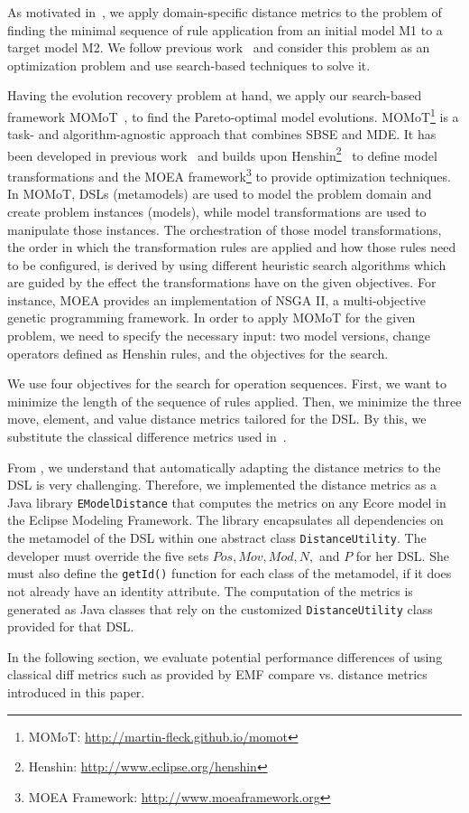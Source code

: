 
As motivated in~, we apply domain-specific distance metrics to the problem of finding the minimal sequence of rule application from an initial model M1 to a target model M2. We follow previous work~\cite{KessentiniMWOD17,FadhelKLW12} and consider this problem as an optimization problem and use search-based techniques to solve it.

Having the evolution recovery problem at hand, we apply our search-based framework MOMoT~\cite{Fleck15,FleckTW16}, to find the Pareto-optimal model evolutions.
MOMoT\footnote{
    MOMoT: \url{http://martin-fleck.github.io/momot}
} is a task- and algorithm-agnostic approach that combines SBSE and MDE.
It has been developed in previous work~\cite{Fleck15} and builds upon Henshin\footnote{
    Henshin: \url{http://www.eclipse.org/henshin}
}~\cite{Arendt10} to define model transformations and the MOEA framework\footnote{
    MOEA Framework: \url{http://www.moeaframework.org}
} to provide optimization techniques.
In MOMoT, DSLs (\ie metamodels) are used to model the problem domain and create problem instances (\ie models), while model transformations are used to manipulate those instances.
The orchestration of those model transformations, \ie the order in which the transformation rules are applied and how those rules need to be configured, is derived by using different heuristic search algorithms which are guided by the effect the transformations have on the given objectives.
For instance, MOEA provides an implementation of NSGA II, a multi-objective genetic programming framework.
In order to apply MOMoT for the given problem, we need to specify the necessary input: two model versions, change operators defined as Henshin rules, and the objectives for the search.

We use four objectives for the search for operation sequences.
First, we want to minimize the length of the sequence of rules applied.
Then, we minimize the three move, element, and value distance metrics tailored for the DSL. By this, we substitute the classical difference metrics used in~\cite{KessentiniMWOD17,FadhelKLW12}. 

From , we understand that automatically adapting the distance metrics to the DSL is very challenging.
Therefore, we implemented the distance metrics as a Java library \texttt{EModelDistance} that computes the metrics on any Ecore model in the Eclipse Modeling Framework.
The library encapsulates all dependencies on the metamodel of the DSL within one abstract class \texttt{DistanceUtility}.
The developer must override the five sets $Pos,Mov,Mod,N,$ and $P$ for her DSL.
She must also define the \texttt{getId()} function for each class of the metamodel, if it does not already have an identity attribute.
The computation of the metrics is generated as Java classes that rely on the customized \texttt{DistanceUtility} class provided for that DSL. 

In the following section, we evaluate potential performance differences of using classical diff metrics such as provided by EMF compare vs. distance metrics introduced in this paper. 